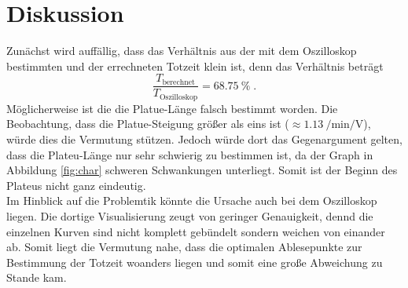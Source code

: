 \section{Diskussion}
\label{sec:Diskussion}
Zunächst wird auffällig, dass das Verhältnis aus der mit dem Oszilloskop bestimmten und der errechneten Totzeit klein ist, denn
das Verhältnis beträgt
\begin{equation*}
    \frac{T_\text{berechnet}}{T_\text{Oszilloskop}} = \SI{68.75}{\percent} \; \text{.}
\end{equation*}
Möglicherweise ist die die Platue-Länge falsch bestimmt worden. 
Die Beobachtung, dass die Platue-Steigung größer als eins ist ($\approx \SI{1.13}{\per\minute\per\volt}$), würde dies die Vermutung stützen. 
Jedoch würde dort das Gegenargument gelten, dass die Plateu-Länge nur sehr schwierig zu bestimmen ist, da der Graph in Abbildung \ref{fig:char}
schweren Schwankungen unterliegt. 
Somit ist der Beginn des Plateus nicht ganz eindeutig. \\
Im Hinblick auf die Problemtik könnte die Ursache auch bei dem Oszilloskop liegen. 
Die dortige Visualisierung zeugt von geringer Genauigkeit, dennd die einzelnen Kurven sind nicht komplett gebündelt sondern weichen von einander ab.
Somit liegt die Vermutung nahe, dass die optimalen Ablesepunkte zur Bestimmung der Totzeit woanders liegen und somit eine große Abweichung zu Stande kam.